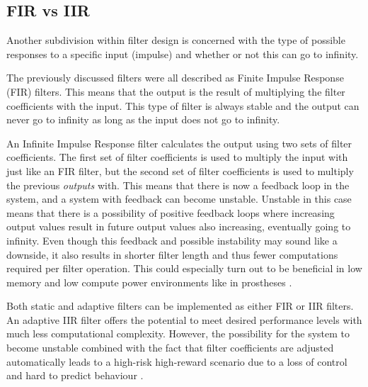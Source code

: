 \subsection{FIR vs IIR}
Another subdivision within filter design is concerned with the type of possible responses to a specific input (impulse) and whether or not this can go to infinity.

The previously discussed filters were all described as Finite Impulse Response (FIR) filters. This means that the output is the result of multiplying the filter coefficients with the input. This type of filter is always stable and the output can never go to infinity as long as the input does not go to infinity.

An Infinite Impulse Response filter calculates the output using two sets of filter coefficients. The first set of filter coefficients is used to multiply the input with just like an FIR filter, but the second set of filter coefficients is used to multiply the previous \textit{outputs} with. This means that there is now a feedback loop in the system, and a system with feedback can become unstable. Unstable in this case means that there is a possibility of positive feedback loops where increasing output values result in future output values also increasing, eventually going to infinity. Even though this feedback and possible instability may sound like a downside, it also results in shorter filter length and thus fewer computations required per filter operation. This could especially turn out to be beneficial in low memory and low compute power environments like in prostheses \cite{fir_vs_iir}.

Both static and adaptive filters can be implemented as either FIR or IIR filters. An adaptive IIR filter offers the potential to meet desired performance levels with much less computational complexity. However, the possibility for the system to become unstable combined with the fact that filter coefficients are adjusted automatically leads to a high-risk high-reward scenario due to a loss of control and hard to predict behaviour \cite{digital_signal_processing_handbook}.


